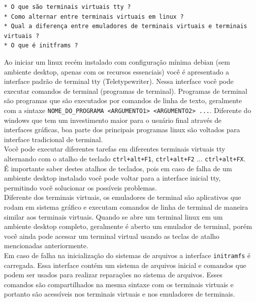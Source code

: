 \documentclass[12pt,a4paper]{article}
\begin{document}
\begin{lstlisting}
* O que são terminais virtuais tty ?
* Como alternar entre terminais virtuais em linux ?
* Qual a diferença entre emuladores de terminais virtuais e terminais virtuais ?
* O que é initframs ? 
\end{lstlisting}

\vspace{\baselineskip}

Ao iniciar um linux recém instalado com configuração mínima debian (sem ambiente desktop, apenas com os recursos essenciais) você é apresentado a interface padrão de terminal tty (Teletypewriter). Nessa interface você pode executar comandos de terminal (programas de terminal). Programas de terminal são programas que são executados por comandos de linha de texto, geralmente com a sintaxe \texttt{NOME\_DO\_PROGRAMA <ARGUMENTO1> <ARGUMENTO2> ...}. Diferente do windows que tem um investimento maior para o usuário final através de interfaces gráficas, boa parte dos principais programas linux são voltados para interface tradicional de terminal. \\

Você pode executar diferentes tarefas em diferentes terminais virtuais tty alternando com o atalho de teclado \texttt{ctrl+alt+F1}, \texttt{ctrl+alt+F2} ... \texttt{ctrl+alt+FX}. É importante saber destes atalhos de teclados, pois em caso de falha de um ambiente desktop instalado você pode voltar para a interface inicial tty, permitindo você solucionar os possíveis problemas.\\

Diferente dos terminais virtuais, os emuladores de terminal são aplicativos que rodam em sistema gráfico e executam comandos de linha de terminal de maneira similar aos terminais virtuais. Quando se abre um terminal linux em um ambiente desktop completo, geralmente é aberto um emulador de terminal, porém você ainda pode acessar um terminal virtual usando as teclas de atalho mencionadas anteriormente. \\ 

Em caso de falha na inicialização do sistemas de arquivos a interface \texttt{initramfs} é carregada. Essa interface contém um sistema de arquivos inicial e comandos que podem ser usados para realizar reparações no sistema de arquivos. Esses comandos são compartilhados na mesma sintaxe com os terminais virtuais e portanto são acessíveis nos terminais virtuais e nos emuladores de terminais. \\
\end{document}

